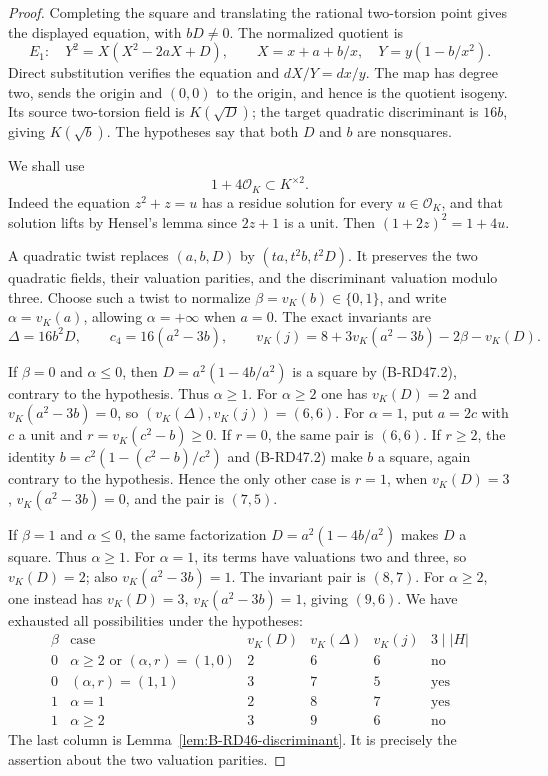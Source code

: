 \begin{proof}
Completing the square and translating the rational two-torsion
point gives the displayed equation, with $bD\ne0$.
The normalized quotient is
\[
 E_1:\quad Y^2=X(X^2-2aX+D),\qquad
 X=x+a+b/x,\quad Y=y(1-b/x^2).                         \tag{B-RD47.1}
\]
Direct substitution verifies the equation and
$dX/Y=dx/y$. The map has degree two, sends the origin and
$(0,0)$ to the origin, and hence is the quotient isogeny.
Its source two-torsion field is $K(\sqrt D)$; the target
quadratic discriminant is $16b$, giving $K(\sqrt b)$.
The hypotheses say that both $D$ and $b$ are nonsquares.

We shall use
\[
                         1+4\mathcal O_K
                              \subset K^{\times2}.     \tag{B-RD47.2}
\]
Indeed the equation $z^2+z=u$ has a residue solution for every
$u\in\mathcal O_K$, and that solution lifts by Hensel's lemma
since $2z+1$ is a unit. Then $(1+2z)^2=1+4u$.

A quadratic twist replaces $(a,b,D)$ by $(ta,t^2b,t^2D)$.
It preserves the two quadratic fields, their valuation
parities, and the discriminant valuation modulo three.
Choose such a twist to normalize
$\beta=v_K(b)\in\{0,1\}$, and write $\alpha=v_K(a)$,
allowing $\alpha=+\infty$ when $a=0$.
The exact invariants are
\[
 \Delta=16b^2D,\qquad c_4=16(a^2-3b),\qquad
 v_K(j)=8+3v_K(a^2-3b)-2\beta-v_K(D).                 \tag{B-RD47.3}
\]

If $\beta=0$ and $\alpha\le0$, then
$D=a^2(1-4b/a^2)$ is a square by (B-RD47.2), contrary to the
hypothesis. Thus $\alpha\ge1$. For $\alpha\ge2$ one has
$v_K(D)=2$ and $v_K(a^2-3b)=0$, so
$(v_K(\Delta),v_K(j))=(6,6)$.
For $\alpha=1$, put $a=2c$ with $c$ a unit and
$r=v_K(c^2-b)\ge0$.
If $r=0$, the same pair is $(6,6)$.
If $r\ge2$, the identity
$b=c^2(1-(c^2-b)/c^2)$ and (B-RD47.2) make $b$ a square,
again contrary to the hypothesis. Hence the only other case
is $r=1$, when $v_K(D)=3$, $v_K(a^2-3b)=0$, and the pair
is $(7,5)$.

If $\beta=1$ and $\alpha\le0$, the same factorization
$D=a^2(1-4b/a^2)$ makes $D$ a square. Thus $\alpha\ge1$.
For $\alpha=1$, its terms have valuations two and three,
so $v_K(D)=2$; also $v_K(a^2-3b)=1$. The invariant pair
is $(8,7)$. For $\alpha\ge2$, one instead has
$v_K(D)=3$, $v_K(a^2-3b)=1$, giving $(9,6)$.
We have exhausted all possibilities under the hypotheses:
\[
\begin{array}{c|c|c|c|c|c}
 \beta&\text{case}&v_K(D)&v_K(\Delta)&v_K(j)
       &3\mid |H|\\\hline
 0&\alpha\ge2\text{ or }(\alpha,r)=(1,0)&2&6&6&\text{no}\\
 0&(\alpha,r)=(1,1)&3&7&5&\text{yes}\\
 1&\alpha=1&2&8&7&\text{yes}\\
 1&\alpha\ge2&3&9&6&\text{no}
\end{array}                                                   \tag{B-RD47.4}
\]
The last column is Lemma~\ref{lem:B-RD46-discriminant}.
It is precisely the assertion about the two valuation parities.
\end{proof}


